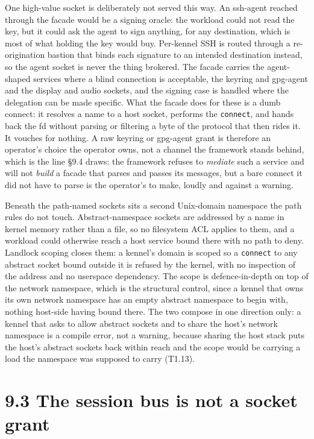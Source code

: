 One high-value socket is deliberately not served this way. An ssh-agent
reached through the facade would be a signing oracle: the workload could
not read the key, but it could ask the agent to sign anything, for any
destination, which is most of what holding the key would buy. Per-kennel
SSH is routed through a re-origination bastion that binds each signature
to an intended destination instead, so the agent socket is never the
thing brokered. The facade carries the agent-shaped services where a
blind connection is acceptable, the keyring and gpg-agent and the
display and audio sockets, and the signing case is handled where the
delegation can be made specific. What the facade does for these is a
dumb connect: it resolves a name to a host socket, performs the
\texttt{connect}, and hands back the fd without parsing or filtering a
byte of the protocol that then rides it. It vouches for nothing. A raw
keyring or gpg-agent grant is therefore an operator's choice the
operator owns, not a channel the framework stands behind, which is the
line §9.4 draws: the framework refuses to \emph{mediate} such a service
and will not \emph{build} a facade that parses and passes its messages,
but a bare connect it did not have to parse is the operator's to make,
loudly and against a warning.

Beneath the path-named sockets sits a second Unix-domain namespace the
path rules do not touch. Abstract-namespace sockets are addressed by a
name in kernel memory rather than a file, so no filesystem ACL applies
to them, and a workload could otherwise reach a host service bound there
with no path to deny. Landlock scoping closes them: a kennel's domain is
scoped so a \texttt{connect} to any abstract socket bound outside it is
refused by the kernel, with no inspection of the address and no
userspace dependency. The scope is defence-in-depth on top of the
network namespace, which is the structural control, since a kennel that
owns its own network namespace has an empty abstract namespace to begin
with, nothing host-side having bound there. The two compose in one
direction only: a kennel that asks to allow abstract sockets and to
share the host's network namespace is a compile error, not a warning,
because sharing the host stack puts the host's abstract sockets back
within reach and the scope would be carrying a load the namespace was
supposed to carry (T1.13).

\hypertarget{the-session-bus-is-not-a-socket-grant}{%
\section{9.3 The session bus is not a socket
grant}\label{the-session-bus-is-not-a-socket-grant}}

